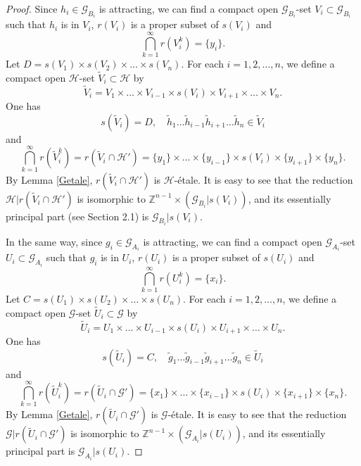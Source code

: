 \documentclass[11pt]{article}
\theoremstyle{definition}
\numberwithin{equation}{section}
\newcommand{\G}{\mathcal{G}}
\renewcommand{\H}{\mathcal{H}}
\newcommand{\Z}{\mathbb{Z}}
\begin{document}
\begin{proof}
Since $h_i\in\G_{B_i}$ is attracting, 
we can find a compact open $\G_{B_i}$-set $V_i\subset\G_{B_i}$ 
such that $h_i$ is in $V_i$, $r(V_i)$ is a proper subset of $s(V_i)$ and 
\[
\bigcap_{k=1}^\infty r(V_i^k)=\{y_i\}. 
\]
Let $D=s(V_1)\times s(V_2)\times\dots\times s(V_n)$. 
For each $i=1,2,\dots,n$, 
we define a compact open $\H$-set $\widetilde V_i\subset\H$ by 
\[
\widetilde V_i=V_1\times\dots\times V_{i-1}\times s(V_i)
\times V_{i+1}\times\dots\times V_n. 
\]
One has 
\[
s(\widetilde V_i)=D,\quad 
\tilde h_1\dots\tilde h_{i-1}\tilde h_{i+1}\dots\tilde h_n\in\widetilde V_i
\]
and 
\[
\bigcap_{k=1}^\infty r(\widetilde V_i^k)=r(\widetilde V_i\cap\H')
=\{y_1\}\times\dots\times\{y_{i-1}\}\times s(V_i)
\times\{y_{i+1}\}\times\{y_n\}. 
\]
By Lemma \ref{Getale}, $r(\widetilde V_i\cap\H')$ is $\H$-\'etale. 
It is easy to see that 
the reduction $\H|r(\widetilde V_i\cap\H')$ is isomorphic to 
$\Z^{n-1}\times(\G_{B_i}|s(V_i))$, 
and its essentially principal part (see Section 2.1) is $\G_{B_i}|s(V_i)$. 

In the same way, 
since $g_i\in\G_{A_i}$ is attracting, 
we can find a compact open $\G_{A_i}$-set $U_i\subset\G_{A_i}$ 
such that $g_i$ is in $U_i$, $r(U_i)$ is a proper subset of $s(U_i)$ and 
\[
\bigcap_{k=1}^\infty r(U_i^k)=\{x_i\}. 
\]
Let $C=s(U_1)\times s(U_2)\times\dots\times s(U_n)$. 
For each $i=1,2,\dots,n$, 
we define a compact open $\G$-set $\widetilde U_i\subset\G$ by 
\[
\widetilde U_i=U_1\times\dots\times U_{i-1}\times s(U_i)
\times U_{i+1}\times\dots\times U_n. 
\]
One has 
\begin{equation}
s(\widetilde U_i)=C,\quad 
\tilde g_1\dots\tilde g_{i-1}\tilde g_{i+1}\dots\tilde g_n\in\widetilde U_i
\label{hare}
\end{equation}
and 
\begin{equation}
\bigcap_{k=1}^\infty r(\widetilde U_i^k)=r(\widetilde U_i\cap\G')
=\{x_1\}\times\dots\times\{x_{i-1}\}\times s(U_i)
\times\{x_{i+1}\}\times\{x_n\}. 
\label{dragon}
\end{equation}
By Lemma \ref{Getale}, $r(\widetilde U_i\cap\G')$ is $\G$-\'etale. 
It is easy to see that 
the reduction $\G|r(\widetilde U_i\cap\G')$ is isomorphic to 
$\Z^{n-1}\times(\G_{A_i}|s(U_i))$, 
and its essentially principal part is $\G_{A_i}|s(U_i)$. 


\end{proof}
\end{document}
